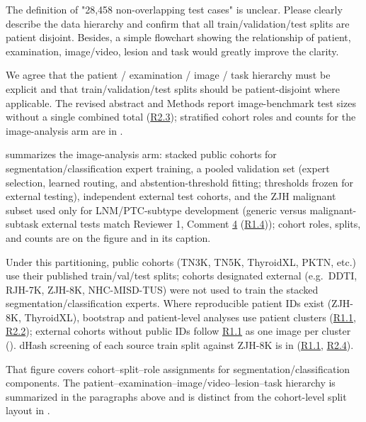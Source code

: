 \label{rev:R3.3}
\begin{reviewercomment}
The definition of "28,458 non-overlapping test cases" is unclear. Please clearly describe the data hierarchy and confirm that all train/validation/test splits are patient disjoint. Besides, a simple flowchart showing the relationship of patient, examination, image/video, lesion and task would greatly improve the clarity.
\end{reviewercomment}
\begin{authorresponse}
We agree that the patient / examination / image / task hierarchy must be explicit and that train/validation/test splits should be patient-disjoint where applicable. The revised abstract and Methods report image-benchmark test sizes without a single combined total (\hyperref[rev:R2.3]{R2.3}); stratified cohort roles and counts for the image-analysis arm are in .\par
{} summarizes the image-analysis arm: stacked public cohorts for segmentation/classification expert training, a pooled validation set (expert selection, learned routing, and abstention-threshold fitting; thresholds frozen for external testing), independent external test cohorts, and the ZJH malignant subset used only for LNM/PTC-subtype development (generic versus malignant-subtask external tests match Reviewer 1, Comment \hyperref[rev:R1.4]{4} (\hyperref[rev:R1.4]{R1.4})); cohort roles, splits, and counts are on the figure and in its caption.\par
Under this partitioning, public cohorts (TN3K, TN5K, ThyroidXL, PKTN, etc.) use their published train/val/test splits; cohorts designated external (e.g.\ DDTI, RJH-7K, ZJH-8K, NHC-MISD-TUS) were not used to train the stacked segmentation/classification experts. Where reproducible patient IDs exist (ZJH-8K, ThyroidXL), bootstrap and patient-level analyses use patient clusters (\hyperref[rev:R1.1]{R1.1}, \hyperref[rev:R2.2]{R2.2}); external cohorts without public IDs follow \hyperref[rev:R1.1]{R1.1} as one image per cluster (). dHash screening of each source train split against ZJH-8K is in  (\hyperref[rev:R1.1]{R1.1}, \hyperref[rev:R2.4]{R2.4}).\par
That figure covers cohort--split--role assignments for segmentation/classification components. The patient--examination--image/video--lesion--task hierarchy is summarized in the paragraphs above and is distinct from the cohort-level split layout in .\par
\par
\end{authorresponse}

